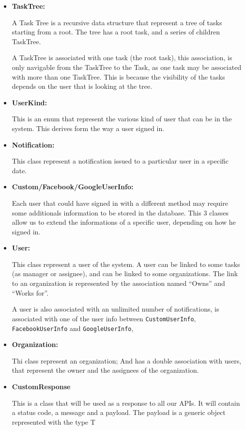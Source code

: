 \documentclass{article}
\begin{document}
\begin{itemize}
    \item \textbf{TaskTree: }
    
    A Task Tree is a recursive data structure that represent a tree of tasks starting from a root.
    The tree has a root task, and a series of children TaskTree.

    A TaskTree is associated with one task (the root task), this association, is only navigable from the TaskTree to the Task,
    as one task may be associated with more than one TaskTree. This is because
    the visibility of the tasks depends on the user that is looking at the tree.

    \item \textbf{UserKind: }

    This is an enum that represent the various kind of user that can be in the system.
    This derives form the way a user signed in.

    \item \textbf{Notification: }
    
    This class represent a notification issued to a particular user in a specific date.

    \item \textbf{Custom/Facebook/GoogleUserInfo: }
    
    Each user that could have signed in with a different method may require some additionals
    information to be stored in the database. This 3 classes allow us to extend the informations
    of a specific user, depending on how he signed in.

    \item \textbf{User: }
    
    This class represent a user of the system. A user can be linked to some tasks (as manager or assignee),
    and can be linked to some organizations.
    The link to an organization is represented by the association named ``Owns'' and ``Works for''.

    A user is also associated with an unlimited number of notifications, is associated
    with one of the user info between \texttt{CustomUserInfo}, \texttt{FacebookUserInfo} and \texttt{GoogleUserInfo},

    \item \textbf{Organization: }
    
    Thi class represent an organization; And has a double association with users, that represent the owner and the assignees of the organization.

    \item \textbf{CustomResponse}

    This is a class that will be used as a response to all our APIs.
    It will contain a status code, a message and a payload.
    The payload is a generic object represented with the type T
\end{itemize}
\end{document}
